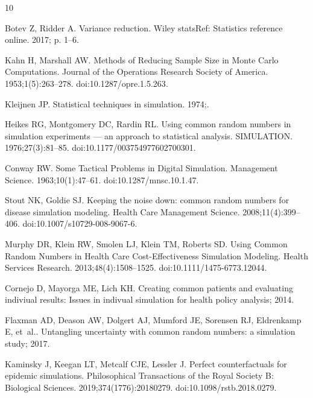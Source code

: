 \documentclass[10pt,letterpaper]{article}
\begin{document}
%
\begin{thebibliography}{10}

Botev Z, Ridder A.
\newblock Variance reduction.
\newblock Wiley statsRef: Statistics reference online. 2017; p. 1--6.

Kahn H, Marshall AW.
\newblock Methods of {Reducing} {Sample} {Size} in {Monte} {Carlo} {Computations}.
\newblock Journal of the Operations Research Society of America. 1953;1(5):263--278.
\newblock doi:{10.1287/opre.1.5.263}.

Kleijnen JP.
\newblock Statistical techniques in simulation. 1974;.

Heikes RG, Montgomery DC, Rardin RL.
\newblock Using common random numbers in simulation experiments — an approach to statistical analysis.
\newblock SIMULATION. 1976;27(3):81--85.
\newblock doi:{10.1177/003754977602700301}.

Conway RW.
\newblock Some {Tactical} {Problems} in {Digital} {Simulation}.
\newblock Management Science. 1963;10(1):47--61.
\newblock doi:{10.1287/mnsc.10.1.47}.

Stout NK, Goldie SJ.
\newblock Keeping the noise down: common random numbers for disease simulation modeling.
\newblock Health Care Management Science. 2008;11(4):399--406.
\newblock doi:{10.1007/s10729-008-9067-6}.

Murphy DR, Klein RW, Smolen LJ, Klein TM, Roberts SD.
\newblock Using {Common} {Random} {Numbers} in {Health} {Care} {Cost}-{Effectiveness} {Simulation} {Modeling}.
\newblock Health Services Research. 2013;48(4):1508--1525.
\newblock doi:{10.1111/1475-6773.12044}.

Cornejo D, Mayorga ME, Lich KH. Creating common patients and evaluating indiviual results: Issues in indivual simulation for health policy analysis; 2014.

Flaxman AD, Deason AW, Dolgert AJ, Mumford JE, Sorensen RJ, Eldrenkamp E, et~al.. Untangling uncertainty with common random numbers: a simulation study; 2017.

Kaminsky J, Keegan LT, Metcalf CJE, Lessler J.
\newblock Perfect counterfactuals for epidemic simulations.
\newblock Philosophical Transactions of the Royal Society B: Biological Sciences. 2019;374(1776):20180279.
\newblock doi:{10.1098/rstb.2018.0279}.


\end{thebibliography}
\end{document}
